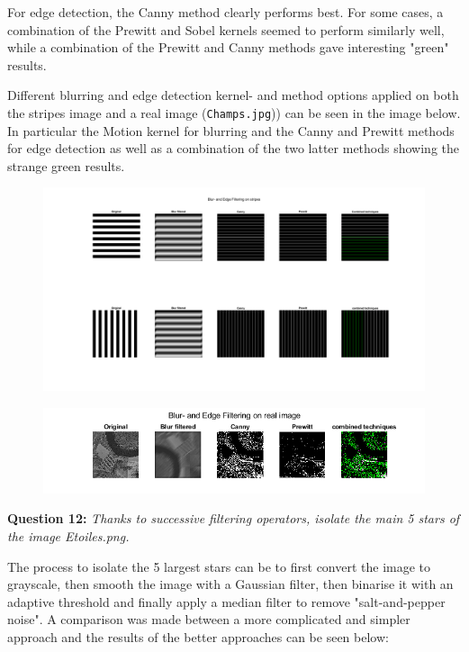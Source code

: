 For edge detection, the Canny method clearly performs best. For some cases, a combination of the Prewitt and Sobel kernels seemed to perform similarly well, while a combination of the Prewitt and Canny methods gave interesting "green" results.

Different blurring and edge detection kernel- and method options applied on both the stripes image and a real image (\texttt{Champs.jpg})) can be seen in the image below. In particular the Motion kernel for blurring and the Canny and Prewitt methods for edge detection as well as a combination of the two latter methods showing the strange green results.


\begin{figure}[H]
    \centering
    \includegraphics[width=\linewidth]{Doc/Graphics/Part1/Q11a.png}
\end{figure}

\begin{figure}[H]
    \centering
    \includegraphics[width=\linewidth]{Doc/Graphics/Part1/Q11b.png}
\end{figure}


\textbf{Question 12:}
\textit{Thanks to successive ﬁltering operators, isolate the main 5 stars of the image Etoiles.png.}

The process to isolate the 5 largest stars can be to first convert the image to grayscale, then smooth the image with a Gaussian filter, then binarise it with an adaptive threshold and finally apply a median filter to remove "salt-and-pepper noise". A comparison was made between a more complicated and simpler approach and the results of the better approaches can be seen below:

